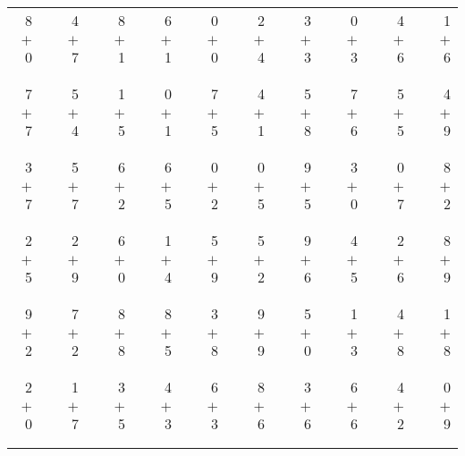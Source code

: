 \documentclass[12pt, letterpaper]{article}
\begin{document}
\begin{tabular}{rrrrrrrrrrrrrrrrrrr}
8 & & 4 & & 8 & & 6 & & 0 & & 2 & & 3 & & 0 & & 4 & & 1\\
$+$ 0 & & $+$ 7 & & $+$ 1 & & $+$ 1 & & $+$ 0 & & $+$ 4 & & $+$ 3 & & $+$ 3 & & $+$ 6 & & $+$ 6\\
\cline{1-1} \cline{3-3} \cline{5-5} \cline{7-7} \cline{9-9} \cline{11-11} \cline{13-13} \cline{15-15} \cline{17-17} \cline{19-19} \\ \\
7 & & 5 & & 1 & & 0 & & 7 & & 4 & & 5 & & 7 & & 5 & & 4\\
$+$ 7 & & $+$ 4 & & $+$ 5 & & $+$ 1 & & $+$ 5 & & $+$ 1 & & $+$ 8 & & $+$ 6 & & $+$ 5 & & $+$ 9\\
\cline{1-1} \cline{3-3} \cline{5-5} \cline{7-7} \cline{9-9} \cline{11-11} \cline{13-13} \cline{15-15} \cline{17-17} \cline{19-19} \\ \\
3 & & 5 & & 6 & & 6 & & 0 & & 0 & & 9 & & 3 & & 0 & & 8\\
$+$ 7 & & $+$ 7 & & $+$ 2 & & $+$ 5 & & $+$ 2 & & $+$ 5 & & $+$ 5 & & $+$ 0 & & $+$ 7 & & $+$ 2\\
\cline{1-1} \cline{3-3} \cline{5-5} \cline{7-7} \cline{9-9} \cline{11-11} \cline{13-13} \cline{15-15} \cline{17-17} \cline{19-19} \\ \\
2 & & 2 & & 6 & & 1 & & 5 & & 5 & & 9 & & 4 & & 2 & & 8\\
$+$ 5 & & $+$ 9 & & $+$ 0 & & $+$ 4 & & $+$ 9 & & $+$ 2 & & $+$ 6 & & $+$ 5 & & $+$ 6 & & $+$ 9\\
\cline{1-1} \cline{3-3} \cline{5-5} \cline{7-7} \cline{9-9} \cline{11-11} \cline{13-13} \cline{15-15} \cline{17-17} \cline{19-19} \\ \\
9 & & 7 & & 8 & & 8 & & 3 & & 9 & & 5 & & 1 & & 4 & & 1\\
$+$ 2 & & $+$ 2 & & $+$ 8 & & $+$ 5 & & $+$ 8 & & $+$ 9 & & $+$ 0 & & $+$ 3 & & $+$ 8 & & $+$ 8\\
\cline{1-1} \cline{3-3} \cline{5-5} \cline{7-7} \cline{9-9} \cline{11-11} \cline{13-13} \cline{15-15} \cline{17-17} \cline{19-19} \\ \\
2 & & 1 & & 3 & & 4 & & 6 & & 8 & & 3 & & 6 & & 4 & & 0\\
$+$ 0 & & $+$ 7 & & $+$ 5 & & $+$ 3 & & $+$ 3 & & $+$ 6 & & $+$ 6 & & $+$ 6 & & $+$ 2 & & $+$ 9\\
\cline{1-1} \cline{3-3} \cline{5-5} \cline{7-7} \cline{9-9} \cline{11-11} \cline{13-13} \cline{15-15} \cline{17-17} \cline{19-19} \\ \\

\end{tabular}
\end{document}
